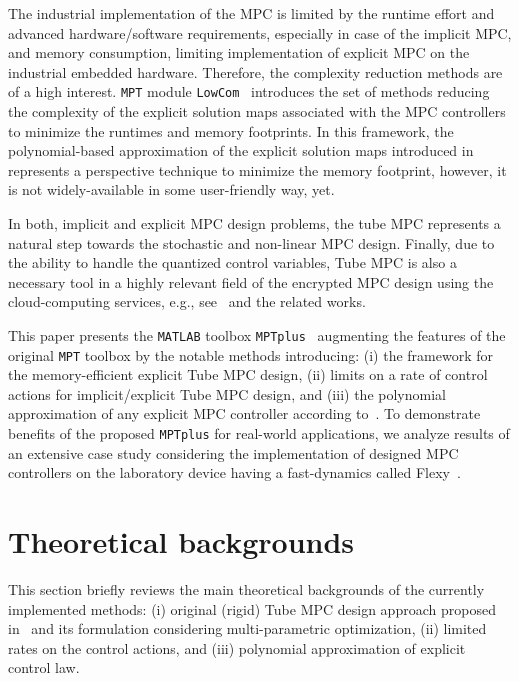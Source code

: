 \documentclass[letterpaper, 10 pt, conference]{ieeeconf}
\begin{document}
The industrial implementation of the MPC is limited by the runtime effort and advanced hardware/software requirements, especially in case of the implicit MPC, and memory consumption, limiting implementation of explicit MPC on the industrial embedded hardware. Therefore, the complexity reduction methods are of a high interest. 
\texttt{MPT} module \texttt{LowCom}~\cite{KH15} introduces the set of methods reducing the complexity of the explicit solution maps associated with the MPC controllers to minimize the runtimes and memory footprints. 
In this framework, the polynomial-based approximation of the explicit solution maps introduced in~\cite{KL11} represents a perspective technique to minimize the memory footprint, however, it is not widely-available in some user-friendly way, yet.

In both, implicit and explicit MPC design problems, the tube MPC represents a natural step towards the stochastic and non-linear MPC design. Finally, due to the ability to handle the quantized control variables, Tube MPC is also a necessary tool in a highly relevant field of the encrypted MPC design using the cloud-computing services, e.g., see~\cite{DR18} and the related works.

This paper presents the \texttt{MATLAB} toolbox \texttt{MPTplus}~\cite{MPTplus} augmenting the features of the original \texttt{MPT} toolbox by the notable methods introducing: (i) the framework for the memory-efficient explicit Tube MPC design, (ii) limits on a rate of control actions for implicit/explicit Tube MPC design, and (iii) the polynomial approximation of any explicit MPC controller according to~\cite{KL11}. To demonstrate benefits of the proposed \texttt{MPTplus} for real-world applications, we analyze results of an extensive case study considering the implementation of designed MPC controllers on the laboratory device having a fast-dynamics called Flexy~\cite{CK19}. 

\section{Theoretical backgrounds}
\label{sec:tube_mpc_theory}

This section briefly reviews the main theoretical backgrounds of the currently implemented methods: (i) original (rigid) Tube MPC design approach proposed in~\cite{MS05} and its formulation considering multi-parametric optimization, (ii) limited rates on the control actions, and (iii) polynomial approximation of explicit control law.
\end{document}
